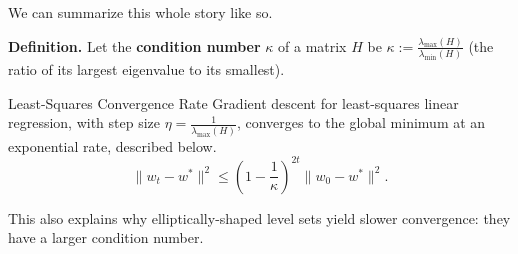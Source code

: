 We can summarize this whole story like so.

\textbf{Definition.}
Let the \textbf{condition number} $\kappa$ of a matrix $H$
be $\kappa := \frac{\lambda_{\mathrm{max}}(H)}{\lambda_{\mathrm{min}}(H)}$
(the ratio of its largest eigenvalue to its smallest).

\begin{theorem}{Least-Squares Convergence Rate}
    Gradient descent for least-squares linear regression,
    with step size $\eta = \frac{1}{\lambda_{\mathrm{max}}(H)}$,
    converges to the global minimum
    at an exponential rate, described below.
    \[ \|w_t - w^*\|^2
    \leq \left(1 - \frac{1}{\kappa}\right)^{2t}
    \|w_0 - w^*\|^2. \]
\end{theorem}

This also explains why elliptically-shaped level sets
yield slower convergence:
they have a larger condition number.

